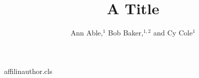 \begin{filecontents*}[overwrite]{affilinauthor.cls}
\def\YES{yes}
\def\chk@key{no}
\def\affilfont{\small\leftskip2em\rightskip0pt plus1fil}
\def\affil#1{\par\ifx\chk@key\YES\else\vskip6\p@\fi{\reset@font\affilfont#1\par}\def\chk@key{yes}}
\def\@maketitle{\newpage{\Large\bfseries\@title\par}\vskip1em\noindent{\bfseries\@author\par}\vskip1em}
\end{filecontents*}
\documentclass{affilinauthor}

\title{A Title}
\author{Ann Able,$^1$ Bob Baker,$^{1,2}$ and Cy Cole$^1$
}
\maketitle
Body.

